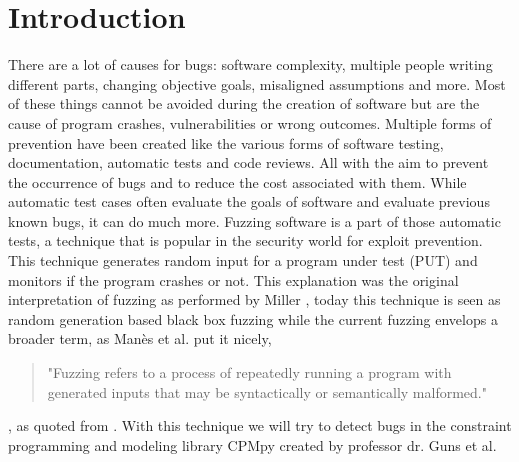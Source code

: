 \chapter{Introduction}
\label{cha:1:intro}
\label{intro:intro}
There are a lot of causes for bugs: software complexity, multiple people writing different parts, changing objective goals, misaligned assumptions and more. Most of these things cannot be avoided during the creation of software but are the cause of program crashes, vulnerabilities or wrong outcomes. Multiple forms of prevention have been created like the various forms of software testing, documentation, automatic tests and code reviews. All with the aim to prevent the occurrence of bugs and to reduce the cost associated with them. While automatic test cases often evaluate the goals of software and evaluate previous known bugs, it can do much more. Fuzzing software is a part of those automatic tests, a technique that is popular in the security world for exploit prevention. This technique generates random input for a program under test (PUT) and monitors if the program crashes or not. This explanation was the original interpretation of fuzzing as performed by Miller \cite{4originalFuzzingUnixUtils}, today this technique is seen as random generation based black box fuzzing while the current fuzzing envelops a broader term, as Man\`es et al. \cite{13manes2019survey} put it nicely,
\begin{quote}
"Fuzzing refers to a process of repeatedly running a program with generated inputs that may be syntactically or semantically malformed."
\end{quote}, as quoted from \cite{13manes2019survey}.
With this technique we will try to detect bugs in the constraint programming and modeling library CPMpy \cite{17guns2019increasing} created by professor dr. Guns et al.

